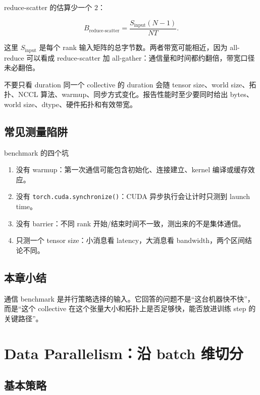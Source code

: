 \documentclass[a4paper]{article}
\newcommand{\code}[1]{\texttt{#1}}
\begin{document}
reduce-scatter 的估算少一个 \(2\)：

\[
B_{\text{reduce-scatter}}
    =
\frac{S_{\text{input}}(N-1)}{N T}.
\]

这里 \(S_{\text{input}}\) 是每个 rank 输入矩阵的总字节数。两者带宽可能相近，因为 all-reduce 可以看成 reduce-scatter 加 all-gather：通信量和时间都约翻倍，带宽口径未必翻倍。

\begin{importantbox}{不要只看 duration}
同一个 collective 的 duration 会随 tensor size、world size、拓扑、NCCL 算法、warmup、同步方式变化。报告性能时至少要同时给出 bytes、world size、dtype、硬件拓扑和有效带宽。
\end{importantbox}

\subsection{常见测量陷阱}

\begin{warningbox}{benchmark 的四个坑}
\begin{enumerate}
    \item 没有 warmup：第一次通信可能包含初始化、连接建立、kernel 编译或缓存效应。
    \item 没有 \code{torch.cuda.synchronize()}：CUDA 异步执行会让计时只测到 launch time。
    \item 没有 barrier：不同 rank 开始/结束时间不一致，测出来的不是集体通信。
    \item 只测一个 tensor size：小消息看 latency，大消息看 bandwidth，两个区间结论不同。
\end{enumerate}
\end{warningbox}

\subsection{本章小结}

通信 benchmark 是并行策略选择的输入。它回答的问题不是“这台机器快不快”，而是“这个 collective 在这个张量大小和拓扑上是否足够快，能否放进训练 step 的关键路径”。

\section{Data Parallelism：沿 batch 维切分}

\subsection{基本策略}
\end{document}
